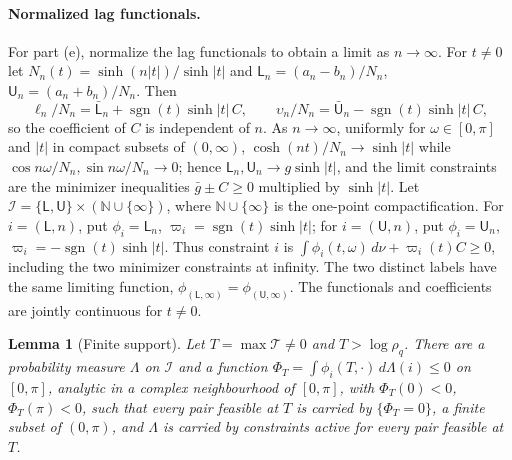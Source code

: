 \documentclass[11pt]{article}
\newtheorem{lemma}[theorem]{Lemma}
\theoremstyle{definition}
\theoremstyle{remark}
\newcommand{\N}{\mathbb N}
\newcommand{\cT}{\mathcal T}
\newcommand{\ch}{\cosh}
\newcommand{\sh}{\sinh}
\begin{document}
\paragraph{Normalized lag functionals.}
For part (e), normalize the lag functionals to obtain a limit as \(n\to\infty\).  For \(t\ne0\) let \(N_n(t)=\sh(n|t|)/\sh|t|\) and
\(\mathsf L_n=(a_n-b_n)/N_n\), \(\mathsf U_n=(a_n+b_n)/N_n\).  Then
\[
\ell_n/N_n=\bar{\mathsf L}_n+\operatorname{sgn}(t)\sh|t|\,C,\qquad
\upsilon_n/N_n=\bar{\mathsf U}_n-\operatorname{sgn}(t)\sh|t|\,C,
\]
so the coefficient of \(C\) is independent of \(n\).  As \(n\to\infty\), uniformly for
\(\omega\in[0,\pi]\) and \(|t|\) in compact subsets of \((0,\infty)\),
\(\ch(nt)/N_n\to\sh|t|\) while \(\cos n\omega/N_n,\sin n\omega/N_n\to0\); hence
\(\mathsf L_n,\mathsf U_n\to g\sh|t|\), and the limit constraints are the minimizer
inequalities \(\bar g\pm C\ge0\) multiplied by \(\sh|t|\).
Let \(\mathcal I=\{\mathsf L,\mathsf U\}\times(\N\cup\{\infty\})\),
where \(\N\cup\{\infty\}\) is the one-point compactification.
For \(i=(\mathsf L,n)\), put
\(\phi_i=\mathsf L_n\), \(\varpi_i=\operatorname{sgn}(t)\sh|t|\);
for \(i=(\mathsf U,n)\), put
\(\phi_i=\mathsf U_n\), \(\varpi_i=-\operatorname{sgn}(t)\sh|t|\).
Thus constraint \(i\) is
\(\int\phi_i(t,\omega)\,d\nu+\varpi_i(t)C\ge0\), including the two
minimizer constraints at infinity.  The two distinct labels have the same limiting function,
\(\phi_{(\mathsf L,\infty)}=\phi_{(\mathsf U,\infty)}\).
The functionals and coefficients are jointly continuous for \(t\ne0\).

\begin{lemma}[Finite support]\label{lem:finite}
Let \(T=\max\cT\ne0\) and \(T>\log\rho_q\).  There are a probability measure \(\Lambda\) on
\(\mathcal I\) and a function \(\Phi_T=\int\phi_i(T,\cdot)\,d\Lambda(i)\le0\) on
\([0,\pi]\), analytic in a complex neighbourhood of \([0,\pi]\), with
\(\Phi_T(0)<0\), \(\Phi_T(\pi)<0\), such that every pair feasible at \(T\) is
carried by \(\{\Phi_T=0\}\), a finite subset of \((0,\pi)\), and \(\Lambda\) is
carried by constraints active for every pair feasible at \(T\).
\end{lemma}
\end{document}

